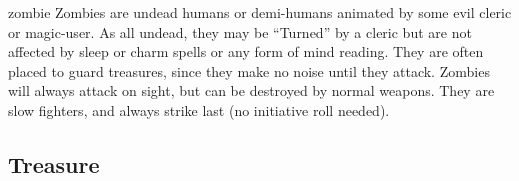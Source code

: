 \documentclass[letterpaper,serif,tightsqueeze]{rpg-module}
\begin{document}
\begin{newmonster}{zombie}
Zombies are undead humans or demi-humans animated by some
evil cleric or magic-user. As all undead, they may be ``Turned'' by
a cleric but are not affected by sleep or charm spells or any form
of mind reading. They are often placed to guard treasures, since
they make no noise until they attack. Zombies will always attack on
sight, but can be destroyed by normal weapons. They are slow
fighters, and always strike last (no initiative roll needed).
\end{newmonster}

\begin{onecolumnfloat}[t]
\part{Treasure}
\end{onecolumnfloat}
\end{document}
